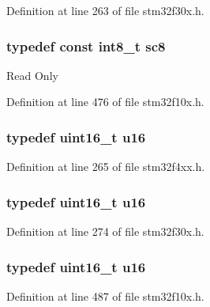 Definition at line 263 of file stm32f30x.\-h.

\hypertarget{group___exported__types_ga30e6c0f6718e1b6d26dc9d94ddcf9d11}{
\subsubsection[{sc8}]{\setlength{\rightskip}{0pt plus 5cm}typedef {\bf const} {\bf int8\-\_\-t} {\bf sc8}}}\label{group___exported__types_ga30e6c0f6718e1b6d26dc9d94ddcf9d11}
Read Only 

Definition at line 476 of file stm32f10x.\-h.

\hypertarget{group___exported__types_gace9d960e74685e2cd84b36132dbbf8aa}{
\subsubsection[{u16}]{\setlength{\rightskip}{0pt plus 5cm}typedef {\bf uint16\-\_\-t} {\bf u16}}}\label{group___exported__types_gace9d960e74685e2cd84b36132dbbf8aa}


Definition at line 265 of file stm32f4xx.\-h.

\hypertarget{group___exported__types_gace9d960e74685e2cd84b36132dbbf8aa}{
\subsubsection[{u16}]{\setlength{\rightskip}{0pt plus 5cm}typedef {\bf uint16\-\_\-t} {\bf u16}}}\label{group___exported__types_gace9d960e74685e2cd84b36132dbbf8aa}


Definition at line 274 of file stm32f30x.\-h.

\hypertarget{group___exported__types_gace9d960e74685e2cd84b36132dbbf8aa}{
\subsubsection[{u16}]{\setlength{\rightskip}{0pt plus 5cm}typedef {\bf uint16\-\_\-t} {\bf u16}}}\label{group___exported__types_gace9d960e74685e2cd84b36132dbbf8aa}


Definition at line 487 of file stm32f10x.\-h.

